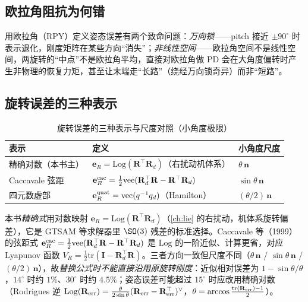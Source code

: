 \subsection{欧拉角阻抗为何错}
\label{sec:os-euler-wrong}

用欧拉角（RPY）定义姿态误差有两个致命问题：\emph{万向锁}——pitch 接近 $\pm90^\circ$ 时表示退化，刚度矩阵在某些方向“消失”；\emph{非线性空间}——欧拉角空间不是线性空间，两旋转的“中点”不是欧拉角平均，直接对欧拉角做 PD 会在大角度偏转时产生非物理的恢复力矩，甚至让末端走“长路”（绕经万向锁奇异）而非“短路”。

\subsection{旋转误差的三种表示}
\label{sec:os-rot-error}

\begin{table}[H]\centering\small
\caption{旋转误差的三种表示与尺度对照（小角度极限）}
\label{tab:os-rot-error}
\begin{tabular}{p{} p{} p{}}
\toprule
表示 & 定义 & 小角度尺度 \\
\midrule
精确对数（本书主） & $\mathbf e_R=\mathrm{Log}(\mathbf R^\top\mathbf R_d)$（右扰动机体系） & $\theta\,\mathbf n$ \\
Caccavale 弦距 & $\mathbf e_R^{\rm cac}=\tfrac12\mathrm{vee}(\mathbf R_d^\top\mathbf R-\mathbf R^\top\mathbf R_d)$ & $\sin\theta\,\mathbf n$ \\
四元数虚部 & $\mathbf e_R^{\rm quat}=\mathrm{vec}(q^{-1}q_d)$（Hamilton） & $(\theta/2)\,\mathbf n$ \\
\bottomrule
\end{tabular}
\end{table}

本书\emph{精确式}用对数映射 $\mathbf e_R=\mathrm{Log}(\mathbf R^\top\mathbf R_d)$（\cref{ch:lie} 的右扰动，机体系旋转偏差），它是 GTSAM 等求解器里 $\SO(3)$ 残差的标准选择。Caccavale 等（1999）的弦距式 $\mathbf e_R^{\rm cac}=\tfrac12\mathrm{vee}(\mathbf R_d^\top\mathbf R-\mathbf R^\top\mathbf R_d)$\cite{caccavale1999sixdof} 是 $\mathrm{Log}$ 的一阶近似、计算更省，对应 Lyapunov 函数 $V_R=\tfrac12\mathrm{tr}(\mathbf I-\mathbf R_d^\top\mathbf R)$。三者方向一致但尺度不同（$\theta\,\mathbf n$ / $\sin\theta\,\mathbf n$ / $(\theta/2)\,\mathbf n$），故\emph{替换公式时不能直接沿用原旋转刚度}：近似相对误差为 $1-\sin\theta/\theta$，$14^\circ$ 时约 $1\%$、$30^\circ$ 时约 $4.5\%$；姿态误差可能超过 $15^\circ$ 时应改用精确对数（Rodrigues 逆 $\mathrm{Log}(\mathbf R_{\rm err})=\tfrac{\theta}{2\sin\theta}(\mathbf R_{\rm err}-\mathbf R_{\rm err}^\top)^\vee$，$\theta=\arccos\tfrac{\mathrm{tr}(\mathbf R_{\rm err})-1}{2}$）。

